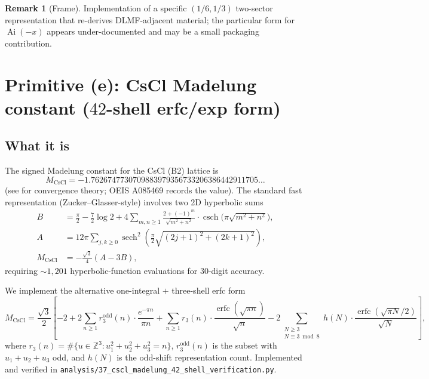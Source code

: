 \documentclass[11pt,reqno]{amsart}
\theoremstyle{definition}
\newtheorem{remark}[theorem]{Remark}
\DeclareMathOperator{\erfc}{erfc}
\DeclareMathOperator{\sech}{sech}
\DeclareMathOperator{\csch}{csch}
\DeclareMathOperator{\Ai}{Ai}
\begin{document}
\begin{remark}[Frame]
Implementation of a specific $(1/6, 1/3)$ two-sector representation
that re-derives DLMF-adjacent material; the particular form for
$\Ai(-x)$ appears under-documented and may be a small packaging
contribution.
\end{remark}

\section{Primitive (e): CsCl Madelung constant ($42$-shell erfc/exp form)}\label{sec:madelung}

\subsection{What it is}
The signed Madelung constant for the CsCl (B2) lattice is
\begin{equation}\label{eq:cscl-value}
M_{\mathrm{CsCl}} = -1.7626747730709883979356733206386442911705\ldots
\end{equation}
(see \cite{BorweinBorweinTaylor1985} for convergence theory; OEIS
A085469 records the value). The standard fast representation
(Zucker--Glasser-style) involves two 2D hyperbolic sums
\begin{align*}
B &= \frac{\pi}{2} - \frac{7}{2} \log 2
   + 4 \sum_{m, n \ge 1}
   \frac{2 + (-1)^m}{\sqrt{m^2 + n^2}} \cdot
   \csch\!\bigl(\pi \sqrt{m^2 + n^2}\bigr), \\
A &= 12 \pi \sum_{j, k \ge 0}
   \sech^2\!\left(\tfrac{\pi}{2} \sqrt{(2j+1)^2 + (2k+1)^2}\right), \\
M_{\mathrm{CsCl}} &= -\frac{\sqrt{3}}{4} (A - 3 B),
\end{align*}
requiring $\sim 1{,}201$ hyperbolic-function evaluations for $30$-digit
accuracy.

We implement the alternative one-integral $+$ three-shell erfc form
\begin{equation}\label{eq:cscl-shells}
M_{\mathrm{CsCl}} = \frac{\sqrt{3}}{2} \left[
-2
+ 2 \sum_{n \ge 1} r_3^{\mathrm{odd}}(n) \cdot \frac{e^{-\pi n}}{\pi n}
+ \sum_{n \ge 1} r_3(n) \cdot \frac{\erfc(\sqrt{\pi n})}{\sqrt{n}}
- 2 \sum_{\substack{N \ge 3 \\ N \equiv 3 \bmod 8}} h(N) \cdot
  \frac{\erfc(\sqrt{\pi N}/2)}{\sqrt{N}}
\right],
\end{equation}
where $r_3(n) = \#\{u \in \mathbb{Z}^3 : u_1^2 + u_2^2 + u_3^2 = n\}$,
$r_3^{\mathrm{odd}}(n)$ is the subset with $u_1 + u_2 + u_3$ odd, and
$h(N)$ is the odd-shift representation count. Implemented and verified
in \verb|analysis/37_cscl_madelung_42_shell_verification.py|.
\end{document}
